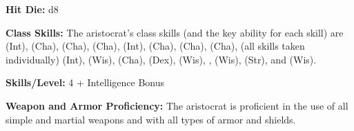 


\textbf{Hit Die:} d8

\textbf{Class Skills:} The aristocrat's class skills (and the key ability for each skill) are  (Int),  (Cha),  (Cha),  (Cha),  (Int),  (Cha),  (Cha),  (Cha),  (all skills taken individually) (Int),  (Wis),  (Cha),  (Dex),  (Wis), ,  (Wis),  (Str), and  (Wis).

\textbf{Skills/Level:} 4 + Intelligence Bonus

\modebab
\poorfor
\poorref
\goodwil

\begin{classtable}
\levelone{--}
\leveltwo{--}
\levelthree{--}
\levelfour{--}
\levelfive{--}
\end{classtable}

\classfeatures

\textbf{Weapon and Armor Proficiency:} The aristocrat is proficient in the use of all simple and martial weapons and with all types of armor and shields.
